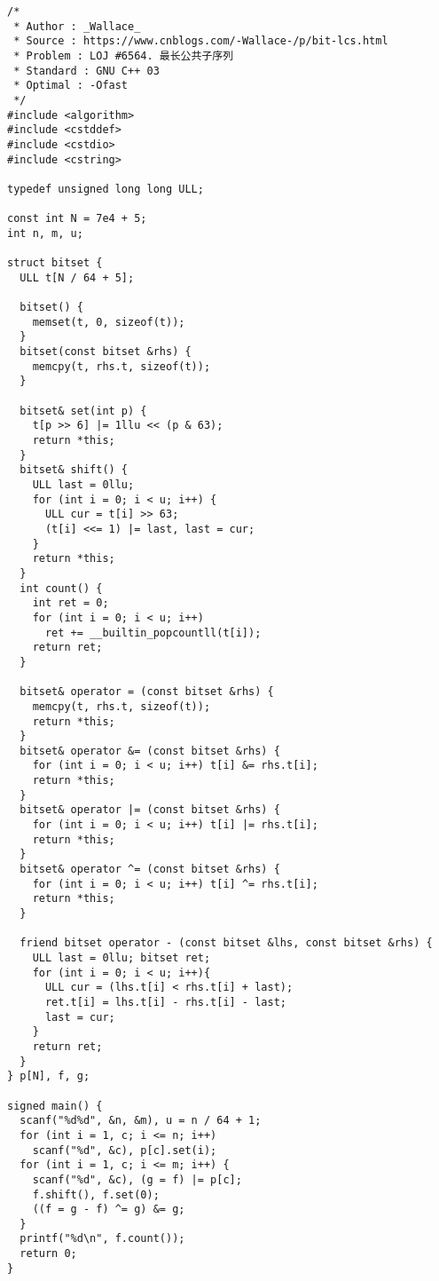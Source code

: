\begin{verbatim}
/*
 * Author : _Wallace_
 * Source : https://www.cnblogs.com/-Wallace-/p/bit-lcs.html
 * Problem : LOJ #6564. 最长公共子序列
 * Standard : GNU C++ 03
 * Optimal : -Ofast
 */
#include <algorithm>
#include <cstddef>
#include <cstdio>
#include <cstring>

typedef unsigned long long ULL;

const int N = 7e4 + 5;
int n, m, u;

struct bitset {
  ULL t[N / 64 + 5];

  bitset() {
    memset(t, 0, sizeof(t));
  }
  bitset(const bitset &rhs) {
    memcpy(t, rhs.t, sizeof(t));
  }

  bitset& set(int p) {
    t[p >> 6] |= 1llu << (p & 63);
    return *this;
  }
  bitset& shift() {
    ULL last = 0llu;
    for (int i = 0; i < u; i++) {
      ULL cur = t[i] >> 63;
      (t[i] <<= 1) |= last, last = cur;
    }
    return *this;
  }
  int count() {
    int ret = 0;
    for (int i = 0; i < u; i++)
      ret += __builtin_popcountll(t[i]);
    return ret;
  }

  bitset& operator = (const bitset &rhs) {
    memcpy(t, rhs.t, sizeof(t));
    return *this;
  }
  bitset& operator &= (const bitset &rhs) {
    for (int i = 0; i < u; i++) t[i] &= rhs.t[i];
    return *this;
  }
  bitset& operator |= (const bitset &rhs) {
    for (int i = 0; i < u; i++) t[i] |= rhs.t[i];
    return *this;
  }
  bitset& operator ^= (const bitset &rhs) {
    for (int i = 0; i < u; i++) t[i] ^= rhs.t[i];
    return *this;
  }

  friend bitset operator - (const bitset &lhs, const bitset &rhs) {
    ULL last = 0llu; bitset ret;
    for (int i = 0; i < u; i++){
      ULL cur = (lhs.t[i] < rhs.t[i] + last);
      ret.t[i] = lhs.t[i] - rhs.t[i] - last;
      last = cur;
    }
    return ret;
  }
} p[N], f, g;

signed main() {
  scanf("%d%d", &n, &m), u = n / 64 + 1;
  for (int i = 1, c; i <= n; i++)
    scanf("%d", &c), p[c].set(i);
  for (int i = 1, c; i <= m; i++) {
    scanf("%d", &c), (g = f) |= p[c];
    f.shift(), f.set(0);
    ((f = g - f) ^= g) &= g;
  }
  printf("%d\n", f.count());
  return 0;
}
\end{verbatim}